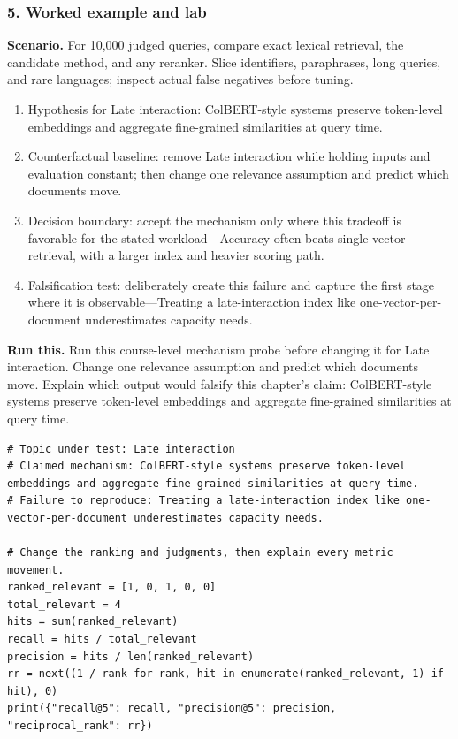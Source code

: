 \subsubsection*{5. Worked example and lab}
\textbf{Scenario.} For 10,000 judged queries, compare exact lexical retrieval, the candidate method, and any reranker. Slice identifiers, paraphrases, long queries, and rare languages; inspect actual false negatives before tuning.
\begin{enumerate}
\item Hypothesis for Late interaction: ColBERT-style systems preserve token-level embeddings and aggregate fine-grained similarities at query time.
\item Counterfactual baseline: remove Late interaction while holding inputs and evaluation constant; then change one relevance assumption and predict which documents move.
\item Decision boundary: accept the mechanism only where this tradeoff is favorable for the stated workload—Accuracy often beats single-vector retrieval, with a larger index and heavier scoring path.
\item Falsification test: deliberately create this failure and capture the first stage where it is observable—Treating a late-interaction index like one-vector-per-document underestimates capacity needs.
\end{enumerate}
\textbf{Run this.} Run this course-level mechanism probe before changing it for Late interaction. Change one relevance assumption and predict which documents move. Explain which output would falsify this chapter's claim: ColBERT-style systems preserve token-level embeddings and aggregate fine-grained similarities at query time.
\begin{Verbatim}[fontsize=\scriptsize]
# Topic under test: Late interaction
# Claimed mechanism: ColBERT-style systems preserve token-level embeddings and aggregate fine-grained similarities at query time.
# Failure to reproduce: Treating a late-interaction index like one-vector-per-document underestimates capacity needs.

# Change the ranking and judgments, then explain every metric movement.
ranked_relevant = [1, 0, 1, 0, 0]
total_relevant = 4
hits = sum(ranked_relevant)
recall = hits / total_relevant
precision = hits / len(ranked_relevant)
rr = next((1 / rank for rank, hit in enumerate(ranked_relevant, 1) if hit), 0)
print({"recall@5": recall, "precision@5": precision, "reciprocal_rank": rr})
\end{Verbatim}
